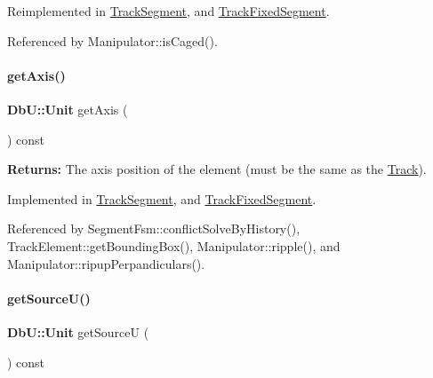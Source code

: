 Reimplemented in \mbox{\hyperlink{classKite_1_1TrackSegment_a55d6115d84c11ad147f4c38fe372ea24}{Track\+Segment}}, and \mbox{\hyperlink{classKite_1_1TrackFixedSegment_a55d6115d84c11ad147f4c38fe372ea24}{Track\+Fixed\+Segment}}.



Referenced by Manipulator\+::is\+Caged().

\mbox{\label{classKite_1_1TrackElement_ac492fb5399691d81c31547db6b56fd03}} 
\paragraph{\texorpdfstring{get\+Axis()}{getAxis()}}
{\footnotesize\ttfamily \textbf{ Db\+U\+::\+Unit} get\+Axis (\begin{DoxyParamCaption}{ }\end{DoxyParamCaption}) const\hspace{0.3cm}{\ttfamily [pure virtual]}}

{\bfseries Returns\+:} The axis position of the element (must be the same as the \mbox{\hyperlink{classKite_1_1Track}{Track}}). 

Implemented in \mbox{\hyperlink{classKite_1_1TrackSegment_ab5b5aaa5b318369feee6003dbad039c2}{Track\+Segment}}, and \mbox{\hyperlink{classKite_1_1TrackFixedSegment_ab5b5aaa5b318369feee6003dbad039c2}{Track\+Fixed\+Segment}}.



Referenced by Segment\+Fsm\+::conflict\+Solve\+By\+History(), Track\+Element\+::get\+Bounding\+Box(), Manipulator\+::ripple(), and Manipulator\+::ripup\+Perpandiculars().

\mbox{\label{classKite_1_1TrackElement_ad521ffba761b0e81b7b81b99d62f76f9}} 
\paragraph{\texorpdfstring{get\+Source\+U()}{getSourceU()}}
{\footnotesize\ttfamily \textbf{ Db\+U\+::\+Unit} get\+SourceU (\begin{DoxyParamCaption}{ }\end{DoxyParamCaption}) const\hspace{0.3cm}{\ttfamily [inline]}}

